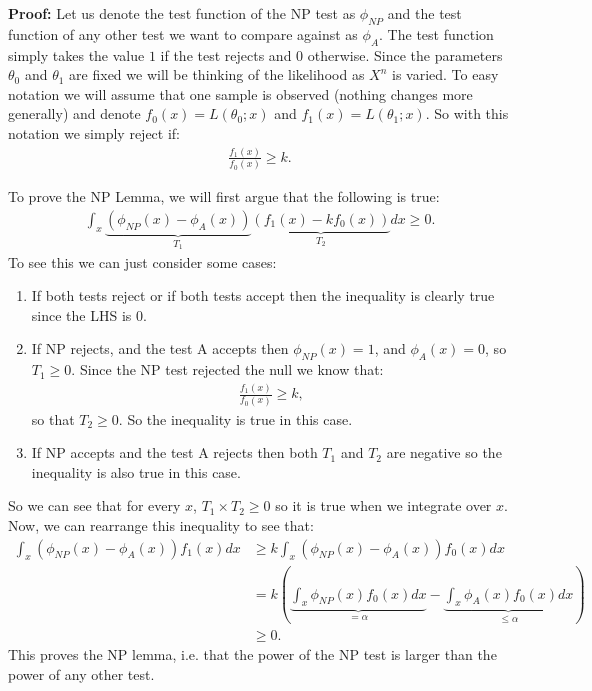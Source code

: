 \documentclass[twoside,12pt]{article}
\begin{document}
{\bf Proof: } Let us denote the test function of the NP test as $\phi_{NP}$ and the test function
of any other test we want to compare against as $\phi_A$. The test function simply takes the value $1$ if the test rejects and $0$ otherwise. Since the parameters $\theta_0$ and $\theta_1$ are fixed we will be thinking of the likelihood as $X^n$ is varied. To easy notation we will assume that one sample is observed (nothing changes more generally) and denote $f_0(x) = L(\theta_0; x)$ and $f_1(x) = L(\theta_1;x)$. So with this notation we simply reject if:
\begin{align*}
\frac{f_1(x)}{f_0(x)} \geq k.
\end{align*}

To prove the NP Lemma, we will first argue that the following is true:
\begin{align*}
\int_x \underbrace{(\phi_{NP}(x) - \phi_{A}(x))}_{T_1} \underbrace{\left(f_1(x) - k f_0(x) \right)}_{T_2}  dx \geq 0.
\end{align*}
To see this we can just consider some cases:
\begin{enumerate}
\item If both tests reject or if both tests accept then the inequality is clearly true since the LHS is 0.
\item If NP rejects, and the test A accepts then $\phi_{NP}(x) = 1$, and $\phi_A(x) = 0$, so $T_1 \geq 0$. Since the NP test rejected the null we know that:
\begin{align*}
\frac{f_1(x)}{f_0(x)} \geq k,
\end{align*}
so that $T_2 \geq 0$. So the inequality is true in this case. 
\item If NP accepts and the test A rejects then both $T_1$ and $T_2$ are negative so the inequality is also true in this case.
\end{enumerate}
So we can see that for every $x$, $T_1 \times T_2 \geq 0$ so it is true when we integrate over $x$.
Now, we can rearrange this inequality to see that:
\begin{align*}
\int_x (\phi_{NP}(x) - \phi_{A}(x)) f_1(x) dx& \geq k \int_x (\phi_{NP}(x) - \phi_{A}(x)) f_0(x) dx \\
&= k  \left(\underbrace{\int_x \phi_{NP}(x) f_0(x) dx}_{= \alpha}  - \underbrace{ \int_x \phi_{A}(x) f_0(x) dx}_{\leq \alpha} \right) \\
&\geq 0.
\end{align*}
This proves the NP lemma, i.e. that the power of the NP test is larger than the power of any other test.
\end{document}
